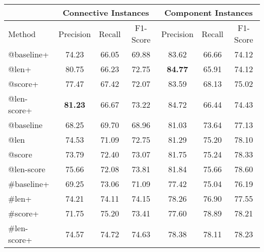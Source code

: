 \begin{table}[ht]
\centering
\begin{tabular}{|l|c|c|c|c|c|c|}
\hline
                            & \multicolumn{3}{c|}{Connective Instances} & \multicolumn{3}{c|}{Component Instances} \\ \hline
    Method                  &     Precision &     Recall &     F1-Score  &     Precision &     Recall &     F1-Score \\ \hline
    @baseline+              &     74.23     &     66.05  &     69.88     &     83.62     &     66.66  &     74.12    \\ \hline
    @len+                   &     80.75     &     66.23  &     72.75     & \bf 84.77     &     65.91  &     74.12    \\ \hline
    @score+                 &     77.47     &     67.42  &     72.07     &     83.59     &     68.13  &     75.02    \\ \hline
    @len-score+             & \bf 81.23     &     66.67  &     73.22     &     84.72     &     66.44  &     74.43    \\

\hhline{|=|=|=|=|=|=|=|}

    @baseline               &     68.25     &     69.70  &     68.96     &     81.03     &     73.64  &     77.13    \\ \hline
    @len                    &     74.53     &     71.09  &     72.75     &     81.29     &     75.20  &     78.10    \\ \hline
    @score                  &     73.79     &     72.40  &     73.07     &     81.75     &     75.24  &     78.33    \\ \hline
    @len-score              &     75.66     &     72.08  &     73.81     &     81.84     &     75.66  &     78.60    \\

\hhline{|=|=|=|=|=|=|=|}

   \#baseline+              &     69.25     &     73.06  &     71.09     &     77.42     &     75.04  &     76.19    \\ \hline
   \#len+                   &     74.21     &     74.11  &     74.15     &     78.26     &     76.90  &     77.55    \\ \hline
   \#score+                 &     71.75     &     75.20  &     73.41     &     77.60     &     78.89  &     78.21    \\ \hline
   \#len-score+             &     74.57     &     74.72  &     74.63     &     78.38     &     78.11  &     78.23    \\


\end{tabular}
\end{table}
